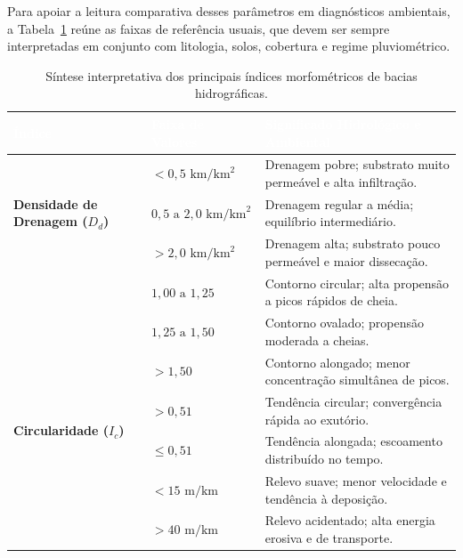 Para apoiar a leitura comparativa desses parâmetros em diagnósticos ambientais, a Tabela~\ref{tab:morfometria_interpretacao} reúne as faixas de referência usuais, que devem ser sempre interpretadas em conjunto com litologia, solos, cobertura e regime pluviométrico.

\begin{table}[H]
\centering
\caption{Síntese interpretativa dos principais índices morfométricos de bacias hidrográficas.}
\label{tab:morfometria_interpretacao}
\renewcommand{\arraystretch}{1.20}
\small
\begin{tabularx}{\textwidth}{@{}p{2.7cm} p{3.1cm} >{\raggedright\arraybackslash}X@{}}
  \toprule
  \rowcolor{uefsNavy}
  \textcolor{white}{\bfseries Índice} & \textcolor{white}{\bfseries Faixa de Valores} & \textcolor{white}{\bfseries Significado Hidrológico e Ambiental} \\
  \midrule
  \multirow{3}{2.7cm}{\textbf{Densidade de Drenagem ($D_d$)}} & $< 0{,}5\text{ km}/\text{km}^2$ & Drenagem pobre; substrato muito permeável e alta infiltração. \\
  & $0{,}5\text{ a } 2{,}0\text{ km}/\text{km}^2$ & Drenagem regular a média; equilíbrio intermediário. \\
  & $> 2{,}0\text{ km}/\text{km}^2$ & Drenagem alta; substrato pouco permeável e maior dissecação. \\
  \midrule
  \rowcolor{bgGray}
  \multirow{3}{2.7cm}{\textbf{Compacidade ($K_c$)}} & $1{,}00\text{ a } 1{,}25$ & Contorno circular; alta propensão a picos rápidos de cheia. \\
  \rowcolor{bgGray}
  & $1{,}25\text{ a } 1{,}50$ & Contorno ovalado; propensão moderada a cheias. \\
  \rowcolor{bgGray}
  & $> 1{,}50$ & Contorno alongado; menor concentração simultânea de picos. \\
  \midrule
  \multirow{2}{2.7cm}{\textbf{Circularidade ($I_c$)}} & $> 0{,}51$ & Tendência circular; convergência rápida ao exutório. \\
  & $\le 0{,}51$ & Tendência alongada; escoamento distribuído no tempo. \\
  \midrule
  \rowcolor{bgGray}
  \multirow{2}{2.7cm}{\textbf{Relação de Relevo ($R_r$)}} & $< 15\text{ m}/\text{km}$ & Relevo suave; menor velocidade e tendência à deposição. \\
  \rowcolor{bgGray}
  & $> 40\text{ m}/\text{km}$ & Relevo acidentado; alta energia erosiva e de transporte. \\
  \bottomrule
\end{tabularx}
\end{table}


